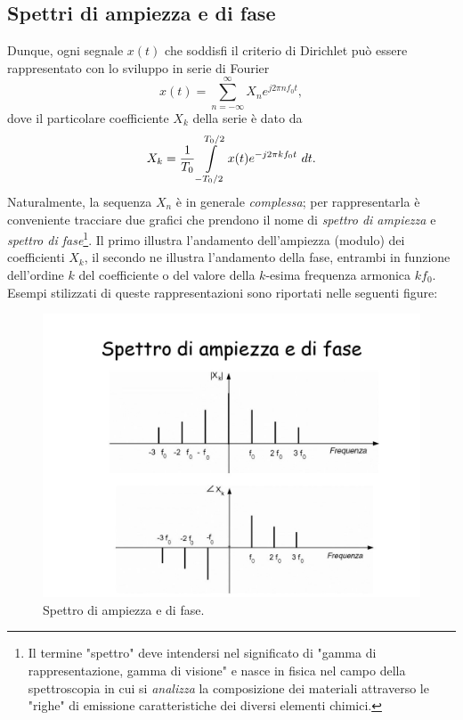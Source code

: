 \documentclass[12pt,oneside,openany]{memoir}
\numberwithin{equation}{subsection}
\newcommand{\dt}{\ dt}
\begin{document}

\subsection{Spettri di ampiezza e di fase}
Dunque, ogni segnale $x(t)$ che soddisfi il criterio di Dirichlet pu\`o essere
rappresentato con lo sviluppo in serie di Fourier
\begin{equation}
	x(t) = \sum_{n = -\infty}^{\infty} X_n e^{j 2 \pi n f_0 t},
\end{equation}
dove il particolare coefficiente $X_k$ della serie \`e dato da
\begin{equation}
	X_k = \frac{1}{T_0} \int\displaylimits_{-T_0/2}^{T_0/2} x(t)
	e^{-j 2 \pi k f_0 t} \dt.
\end{equation}
Naturalmente, la sequenza $X_n$ \`e in generale \textit{complessa}; per
rappresentarla \`e conveniente tracciare due grafici che prendono il nome di
\textit{spettro di ampiezza} e \textit{spettro di fase}\footnote{Il termine
"spettro" deve intendersi nel significato di "gamma di rappresentazione,
gamma di visione" e nasce in fisica nel campo della spettroscopia in cui si
\textit{analizza} la composizione dei materiali attraverso le "righe" di
emissione caratteristiche dei diversi elementi chimici.}. Il primo illustra
l'andamento dell'ampiezza (modulo) dei coefficienti $X_k$, il secondo ne
illustra l'andamento della fase, entrambi in funzione dell'ordine $k$ del
coefficiente o del valore della $k$-esima frequenza armonica $k f_0$. Esempi
stilizzati di queste rappresentazioni sono riportati nelle seguenti figure:
\begin{figure}[H]
	\centering
	\captionsetup{justification=centering}
	\includegraphics[width=1.0\textwidth]{images/spettro_di_ampiezza_e_di_fase.jpg}
	\caption{Spettro di ampiezza e di fase.}
\end{figure}
\end{document}
